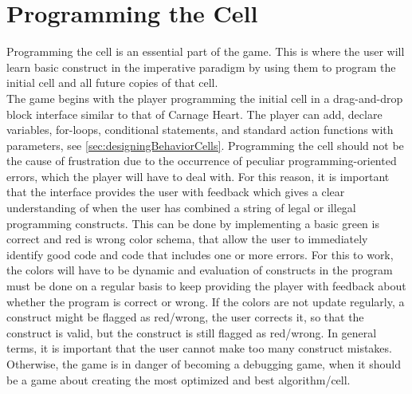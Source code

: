 \section{Programming the Cell}

Programming the cell is an essential part of the game. This is where the user will learn basic construct in the imperative paradigm by using them to program the initial cell and all future copies of that cell.\\

The game begins with the player programming the initial cell in a drag-and-drop block interface similar to that of Carnage Heart.
The player can add, declare variables, for-loops, conditional statements, and standard action functions with parameters, see \autoref{sec:designingBehaviorCells}.
Programming the cell should not be the cause of frustration due to the occurrence of peculiar programming-oriented errors, which the player will have to deal with.
For this reason, it is important that the interface provides the user with feedback which gives a clear understanding of when the user has combined a string of legal or illegal programming constructs.
This can be done by implementing a basic green is correct and red is wrong color schema, that allow the user to immediately identify good code and code that includes one or more errors.
For this to work, the colors will have to be dynamic and evaluation of constructs in the program must be done on a regular basis to keep providing the player with feedback about whether the program is correct or wrong.
If the colors are not update regularly, a construct might be flagged as red/wrong, the user corrects it, so that the construct is valid, but the construct is still flagged as red/wrong.
In general terms, it is important that the user cannot make too many construct mistakes.
Otherwise, the game is in danger of becoming a debugging game, when it should be a game about creating the most optimized and best algorithm/cell.






